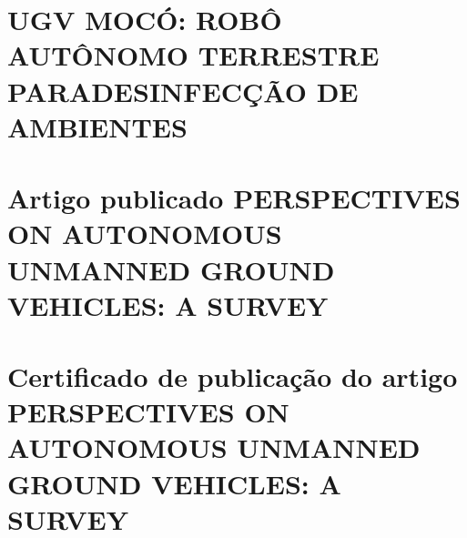\documentclass[fancyheadings, fancychapter, sureport]{Classes/a-prj}
\begin{document}
\begin{thesisappendices}
        \chapter{UGV MOCÓ: ROBÔ AUTÔNOMO TERRESTRE PARADESINFECÇÃO DE AMBIENTES}
        \label{appen:ugv}
        

        \chapter{Artigo publicado PERSPECTIVES ON AUTONOMOUS UNMANNED GROUND VEHICLES: A SURVEY}
        \label{appen:ugv_artigo}
        

        \chapter{Certificado de publicação do artigo PERSPECTIVES ON AUTONOMOUS UNMANNED GROUND VEHICLES: A SURVEY}
        \label{appen:ugv_certificado}
        
    \end{thesisappendices}
%
%     
    
\end{document}
